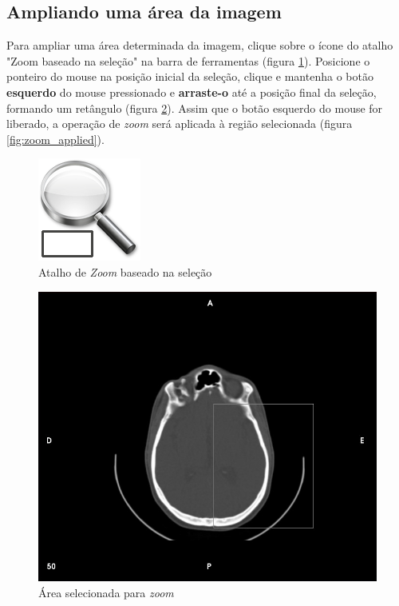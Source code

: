 \subsection{Ampliando uma área da imagem}

Para ampliar uma área determinada da imagem, clique sobre o ícone do atalho "Zoom baseado na seleção" 
na barra de ferramentas (figura \ref{fig:zoom_icon_loc}). Posicione o ponteiro do mouse na posição
inicial da seleção, clique e mantenha o botão \textbf{esquerdo} do mouse pressionado e \textbf{arraste-o}
até a posição final da seleção, formando um retângulo (figura \ref{fig:zoom_select}). Assim que o
botão esquerdo do mouse for liberado, a operação de \textit{zoom} será aplicada à região selecionada
(figura \ref{fig:zoom_applied}).

\begin{figure}[!htb]
\centering
\includegraphics[scale=0.25]{../user_guide_figures/icons/tool_zoom_select_original.png}
\caption{Atalho de \textit{Zoom} baseado na seleção}
\label{fig:zoom_icon_loc}
\end{figure}

\begin{figure}[!htb]
\centering
\includegraphics[scale=0.15]{../user_guide_figures/invesalius_screen/tool_zoom_select_image.jpg}
\caption{Área selecionada para \textit{zoom}}
\label{fig:zoom_select}
\end{figure}

